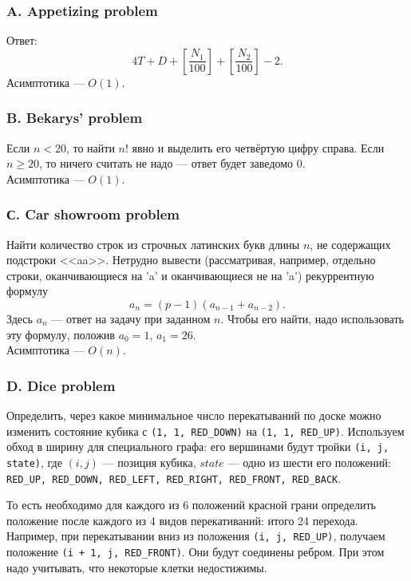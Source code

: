 \subsubsection*{A. Appetizing problem}

Ответ:
$$
4T+D+\left[\frac{N_1}{100}\right]+\left[\frac{N_2}{100}\right]-2. 
$$
Асимптотика --- $O(1)$.


\subsubsection*{B. Bekarys' problem}

Если $n<20$, то найти $n!$ явно и выделить его четвёртую цифру справа. Если $n\geqslant 20$, то ничего считать не надо --- ответ будет заведомо 0.\\
Асимптотика --- $O(1)$.

\subsubsection*{С. Car showroom problem}

Найти количество строк из строчных латинских букв длины $n$, не содержащих подстроки <<aa>>. Нетрудно вывести (рассматривая, например, отдельно строки, оканчивающиеся на 'a' и оканчивающиеся не на 'a') рекуррентную формулу
$$
a_n = (p-1)(a_{n-1}+a_{n-2}).
$$
Здесь $a_n$ --- ответ на задачу при заданном $n$. Чтобы его найти, надо использовать эту формулу, положив $a_0=1$, $a_1=26$.\\
Асимптотика --- $O(n)$.
 
\subsubsection*{D. Dice problem}

Определить, через какое минимальное число перекатываний по доске можно изменить состояние кубика с {\tt (1, 1, RED\_DOWN)} на {\tt (1, 1, RED\_UP)}. Используем обход в ширину для специального графа: его вершинами будут тройки {\tt (i, j, state)}, где $(i, j)$ --- позиция кубика, $state$ --- одно из шести его положений: {\tt RED\_UP, RED\_DOWN, RED\_LEFT, RED\_RIGHT, RED\_FRONT, RED\_BACK}. 

То есть необходимо для каждого из 6 положений красной грани определить положение после каждого из 4 видов перекативаний: итого 24 перехода. Например, при перекатывании вниз из положения {\tt (i, j, RED\_UP)}, получаем положение {\tt (i + 1, j, RED\_FRONT)}. Они будут соединены ребром. При этом надо учитывать, что некоторые клетки недостижимы.

